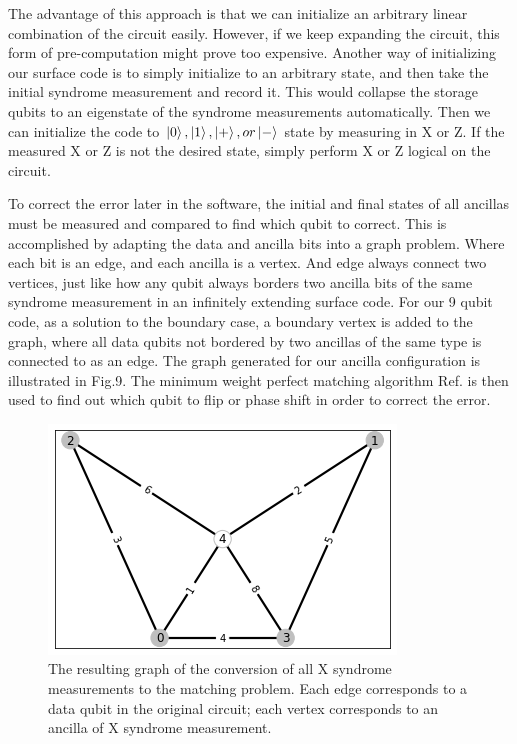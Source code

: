 \documentclass{article}
\begin{document}
The advantage of this approach is that we can initialize an arbitrary linear combination of the circuit easily. However, if we keep expanding the circuit, this form of pre-computation might prove too expensive. Another way of initializing our surface code is to simply initialize to an arbitrary state, and then take the initial syndrome measurement and record it. This would collapse the storage qubits to an eigenstate of the syndrome measurements automatically. Then we can initialize the code to $\ket{0}, \ket{1}, \ket{+}, or \ket{-}$ state by measuring in X or Z. If the measured X or Z is not the desired state, simply perform X or Z logical on the circuit.

To correct the error later in the software, the initial and final states of all ancillas must be measured and compared to find which qubit to correct. This is accomplished by adapting the data and ancilla bits into a graph problem. Where each bit is an edge, and each ancilla is a vertex. And edge always connect two vertices, just like how any qubit always borders two ancilla bits of the same syndrome measurement in an infinitely extending surface code. For our 9 qubit code, as a solution to the boundary case, a boundary vertex is added to the graph, where all data qubits not bordered by two ancillas of the same type is connected to as an edge. The graph generated for our ancilla configuration is illustrated in Fig.9. The minimum weight perfect matching algorithm Ref.\cite{cookComputingMinimumWeightPerfect1999} is then used to find out which qubit to flip or phase shift in order to correct the error.

\begin{figure}[h]
    \centering
    \includegraphics[width = 0.7\linewidth]{surface/matching.png}
    \caption{The resulting graph of the conversion of all X syndrome measurements to the matching problem. Each edge corresponds to a data qubit in the original circuit; each vertex corresponds to an ancilla of X syndrome measurement.}
    \label{fig:my_label}
\end{figure}
\end{document}
